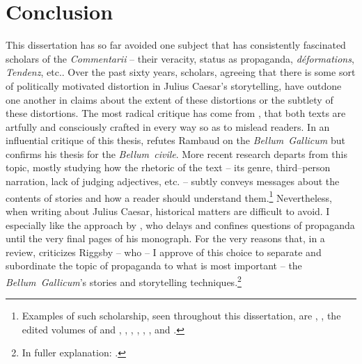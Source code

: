 \documentclass[12pt,letterpaper,oneside,final]{memoir}
\begin{document}
\cleardoublepage
\clearpage
{}
{}
\chapter*[Conclusion]{Conclusion}%
\label{ch-conclusion}
\setcounter{footnote}{0}
This dissertation has so far avoided one subject that has consistently fascinated scholars of the \emph{Commentarii} -- their veracity, status as propaganda, \emph{\textfrench{déformations}}, \emph{\textgerman{Tendenz}}, etc.. Over the past sixty years, scholars, agreeing that there is some sort of politically motivated distortion in Julius Caesar's storytelling, have outdone one another in claims about the extent of these distortions or the subtlety of these distortions. The most radical critique has come from \textcite{rambaud1966}, that both texts are artfully and consciously crafted in every way so as to mislead readers. In an influential critique of this thesis, \textcite{collins1972} refutes Rambaud on the \emph{Bellum~Gallicum} but confirms his thesis for the \emph{Bellum~civile}. More recent research departs from this topic, mostly studying how the rhetoric of the text -- its genre, third--person narration, lack of judging adjectives, etc. -- subtly conveys messages about the contents of stories and how a reader should understand them.\footnote{Examples \label{ft-simple-narr} of such scholarship, seen throughout this dissertation, are \textcite{batstone1990}, \textcite{batstone1991}, the edited volumes of \textcite{welchpowell1998} and \textcite{cairnsfantham2003}, \textcite{lieberg2003}, \textcite{kraus2005}, \textcite[esp.~pp.~207--214]{riggsby2006}, \textcite{kraus2007}, \textcite{bartley2008}, and \textcite[159--165]{kraus2009}.} Nevertheless, when writing about Julius Caesar, historical matters are difficult to avoid. I especially like the approach by \textcite[207--214]{riggsby2006}, who delays and confines questions of propaganda until the very final pages of his monograph. For the very reasons that, in a review, \textcite{melchior2006} criticizes Riggsby -- who  -- I approve of this choice to separate and subordinate the topic of propaganda to what is most important -- the \emph{Bellum~Gallicum}'s stories and storytelling techniques.\footnote{In fuller explanation: .} 
\end{document}
